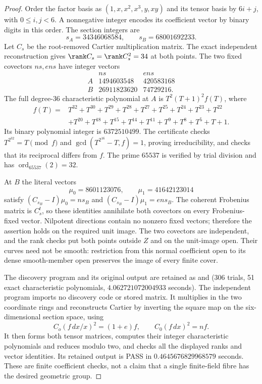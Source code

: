 \begin{proof}
Order the factor basis as $(1,x,x^2,x^3,y,xy)$ and its tensor
basis by $6i+j$, with $0\le i,j<6$. A nonnegative integer
encodes its coefficient vector by binary digits in this order.
The section integers are
\[
                 s_A=34346068584,\qquad s_B=68001692233.
\]
Let $C_s$ be the root-removed Cartier multiplication matrix.
The exact independent reconstruction gives
$\rank C_s=\rank C_s^2=34$ at both points. The two fixed
covectors $ns,ens$ have integer vectors
\[
 \begin{array}{c|cc}
  &ns&ens\\\hline
 A&1494603548&420583168\\
 B&26911823620&74729216.
 \end{array}
\]
The full degree-$36$ characteristic polynomial at $A$ is
$T^2(T+1)^2 f(T)$, where
\[
 \begin{split}
 f(T)={}&T^{32}+T^{30}+T^{29}+T^{28}+T^{27}+T^{25}
       +T^{24}+T^{23}+T^{22}\\
       &+T^{20}+T^{18}+T^{15}+T^{14}+T^{11}+T^9+T^8
       +T^5+T+1.
 \end{split}
\]
Its binary polynomial integer is $6372510499$.
The certificate checks $T^{2^{32}}=T\pmod f$ and
$\gcd(T^{2^{16}}-T,f)=1$, proving irreducibility, and checks
that its reciprocal differs from $f$. The prime $65537$
is verified by trial division and has $\operatorname{ord}_{65537}(2)=32$.

At $B$ the literal vectors
\[
                         \mu_0=8601123076,\qquad
                         \mu_1=41642123014
\]
satisfy $(C_{s_B}-I)\mu_0=ns_B$ and
$(C_{s_B}-I)\mu_1=ens_B$.
The coherent Frobenius matrix is $C_s^t$, so these identities
annihilate both covectors on every Frobenius-fixed vector.
Nilpotent directions contain no nonzero fixed vectors;
therefore the assertion holds on the required unit image.
The two covectors are independent, and the rank checks put
both points outside $Z$ and on the unit-image open.
Their curves need not be smooth: restriction from this normal
coefficient open to its dense smooth-member open preserves
the image of every finite cover.

The discovery program and its original output are retained as
and 
(306 trials, 51 exact characteristic polynomials,
$4.062721072004933$ seconds).
The independent program
imports no discovery code or stored matrix. It multiplies in
the two coordinate rings and reconstructs Cartier by inverting
the square map on the six-dimensional section space, using
\[
 C_o(f\,dx/x)^2=(1+e)f,\qquad C_0(f\,dx)^2=n f.
\]
It then forms both tensor matrices, computes their integer
characteristic polynomials and reduces modulo two, and checks
all the displayed ranks and vector identities. Its retained
output 
is PASS in $0.4645676829968579$ seconds. These are finite
coefficient checks, not a claim that a single finite-field
fibre has the desired geometric group.
\end{proof}


